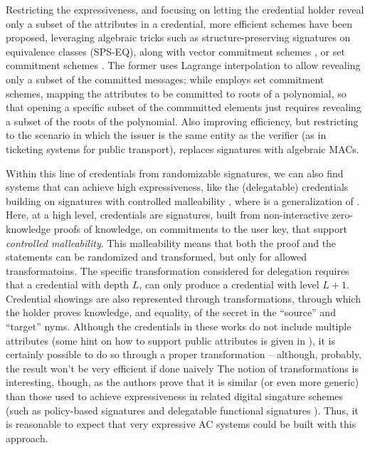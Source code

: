 Restricting the expressiveness, and focusing on letting the credential holder
reveal only a subset of the attributes in a credential, more efficient schemes
have been proposed, leveraging algebraic tricks such as structure-preserving
signatures on equivalence classes (SPS-EQ), along with vector commitment schemes
\cite{cdhk15}, or set commitment schemes \cite{fhs19}. The former uses Lagrange
interpolation to allow revealing only a subset of the committed messages;
while \cite{fhs19} employs set commitment schemes, mapping the attributes to
be committed to roots of a polynomial, so that opening a specific subset of the
commmitted elements just requires revealing a subset of the roots of the
polynomial.
%
Also improving efficiency, but restricting to the scenario in which the issuer
is the same entity as the verifier (as in ticketing systems for public transport),
\cite{cmz14} replaces signatures with algebraic MACs.

Within this line of credentials from randomizable signatures, we can also find
systems that can achieve high expressiveness, like the (delegatable) credentials
building on signatures with controlled malleability \cite{bcc+09,cklm14},
where \cite{cklm14} is a generalization of \cite{bcc+09}. Here, at a high level,
credentials are signatures, built from non-interactive zero-knowledge proofs of
knowledge, on commitments to the user key, that support \emph{controlled
  malleability}. This malleability means
that both the proof and the statements can be randomized and transformed, but
only for allowed transformatoins. The specific transformation considered for
delegation requires that a credential with depth $L$, can only produce a credential
with level $L+1$. Credential showings are also represented through transformations,
through which the holder proves knowledge, and equality, of the secret in the
``source'' and ``target'' nyms. Although the credentials in these works do not
include multiple attributes (some hint on how to support public attributes is
given in \cite{bcc+09}), it is certainly possible to do so through a proper
transformation -- although, probably, the result won't be very efficient if
done naively  The notion of transformations is interesting,
though, as the authors prove that it is similar (or even more generic) than those
used to achieve expressiveness in related digital singature schemes (such as
policy-based signatures \cite{bf14} and delegatable functional signatures \cite{bms16}).
Thus, it is reasonable to expect that very expressive AC systems could be built
with this approach.

